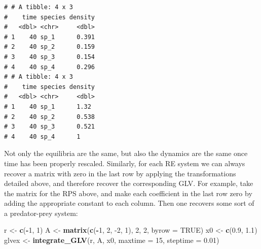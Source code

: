 \documentclass[
]{book}
\newenvironment{Shaded}{\begin{snugshade}}{\end{snugshade}}
\newcommand{\DataTypeTok}[1]{\textcolor[rgb]{0.13,0.29,0.53}{#1}}
\newcommand{\DecValTok}[1]{\textcolor[rgb]{0.00,0.00,0.81}{#1}}
\newcommand{\FloatTok}[1]{\textcolor[rgb]{0.00,0.00,0.81}{#1}}
\newcommand{\KeywordTok}[1]{\textcolor[rgb]{0.13,0.29,0.53}{\textbf{#1}}}
\newcommand{\NormalTok}[1]{#1}
\newcommand{\OperatorTok}[1]{\textcolor[rgb]{0.81,0.36,0.00}{\textbf{#1}}}
\newcommand{\OtherTok}[1]{\textcolor[rgb]{0.56,0.35,0.01}{#1}}
\newcommand{\StringTok}[1]{\textcolor[rgb]{0.31,0.60,0.02}{#1}}
\begin{document}
\begin{Shaded}
\end{Shaded}

\begin{verbatim}
# # A tibble: 4 x 3
#    time species density
#   <dbl> <chr>     <dbl>
# 1    40 sp_1      0.391
# 2    40 sp_2      0.159
# 3    40 sp_3      0.154
# 4    40 sp_4      0.296
# # A tibble: 4 x 3
#    time species density
#   <dbl> <chr>     <dbl>
# 1    40 sp_1      1.32 
# 2    40 sp_2      0.538
# 3    40 sp_3      0.521
# 4    40 sp_4      1
\end{verbatim}

Not only the equilibria are the same, but also the dynamics are the same once time has been properly rescaled. Similarly, for each RE system we can always recover a matrix with zero in the last row by applying the transformations detailed above, and therefore recover the corresponding GLV. For example, take the matrix for the RPS above, and make each coefficient in the last row zero by adding the appropriate constant to each column. Then one recovers some sort of a predator-prey system:

\begin{Shaded}
\begin{Highlighting}[]
\NormalTok{r <-}\StringTok{ }\KeywordTok{c}\NormalTok{(}\OperatorTok{-}\DecValTok{1}\NormalTok{, }\DecValTok{1}\NormalTok{)}
\NormalTok{A <-}\StringTok{ }\KeywordTok{matrix}\NormalTok{(}\KeywordTok{c}\NormalTok{(}\OperatorTok{-}\DecValTok{1}\NormalTok{, }\DecValTok{2}\NormalTok{,}
              \DecValTok{-2}\NormalTok{, }\DecValTok{1}\NormalTok{), }\DecValTok{2}\NormalTok{, }\DecValTok{2}\NormalTok{, }\DataTypeTok{byrow =} \OtherTok{TRUE}\NormalTok{)}
\NormalTok{x0 <-}\StringTok{ }\KeywordTok{c}\NormalTok{(}\FloatTok{0.9}\NormalTok{, }\FloatTok{1.1}\NormalTok{)}
\NormalTok{glvex <-}\StringTok{ }\KeywordTok{integrate_GLV}\NormalTok{(r, A, x0, }\DataTypeTok{maxtime =} \DecValTok{15}\NormalTok{, }\DataTypeTok{steptime =} \FloatTok{0.01}\NormalTok{)}
\end{Highlighting}
\end{Shaded}
\end{document}
